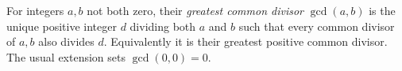 
For integers $a,b$ not both zero, their \emph{greatest common divisor} $\gcd(a,b)$ is the unique positive integer $d$ dividing both $a$ and $b$ such that every common divisor of $a,b$ also divides $d$. Equivalently it is their greatest positive common divisor. The usual extension sets $\gcd(0,0)=0$.
